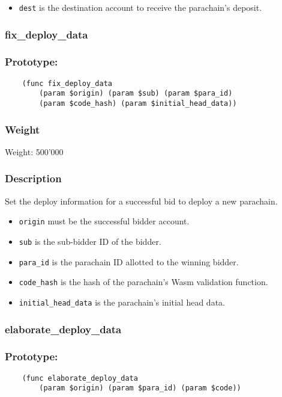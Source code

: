 \documentclass[11pt,a4paper]{article}
\begin{document}
\begin{itemize}
\item \verb|dest| is the destination account to receive the parachain's deposit.
\end{itemize}

\subsubsection{fix\_deploy\_data}
\subsubsection*{Prototype:}
\begin{verbatim}
    (func fix_deploy_data
        (param $origin) (param $sub) (param $para_id)
        (param $code_hash) (param $initial_head_data))
\end{verbatim}
\subsubsection*{Weight}
Weight: 500'000
\subsubsection*{Description}
Set the deploy information for a successful bid to deploy a new parachain.

\begin{itemize}
\item \verb|origin| must be the successful bidder account.
\item \verb|sub| is the sub-bidder ID of the bidder.
\item \verb|para_id| is the parachain ID allotted to the winning bidder.
\item \verb|code_hash| is the hash of the parachain's Wasm validation function.
\item \verb|initial_head_data| is the parachain's initial head data.
\end{itemize}

\subsubsection{elaborate\_deploy\_data}
\subsubsection*{Prototype:}
\begin{verbatim}
    (func elaborate_deploy_data
        (param $origin) (param $para_id) (param $code))
\end{verbatim}
\end{document}

